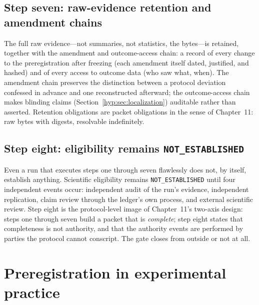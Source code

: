 \subsection{Step seven: raw-evidence retention and amendment chains}\label{hyp:sec:step7}

The full raw evidence---not summaries, not statistics, the bytes---is retained, together with the amendment and outcome-access chain: a record of every change to the preregistration after freezing (each amendment itself dated, justified, and hashed) and of every access to outcome data (who saw what, when). The amendment chain preserves the distinction between a protocol deviation confessed in advance and one reconstructed afterward; the outcome-access chain makes blinding claims (Section~\ref{hyp:sec:localization}) auditable rather than asserted. Retention obligations are packet obligations in the sense of Chapter~11: raw bytes with digests, resolvable indefinitely.

\subsection{Step eight: eligibility remains \texttt{NOT\_ESTABLISHED}}\label{hyp:sec:step8}

Even a run that executes steps one through seven flawlessly does not, by itself, establish anything. Scientific eligibility remains \texttt{NOT\_ESTABLISHED} until four independent events occur: independent audit of the run's evidence, independent replication, claim review through the ledger's own process, and external scientific review. Step eight is the protocol-level image of Chapter~11's two-axis design: steps one through seven build a packet that is \emph{complete}; step eight states that completeness is not authority, and that the authority events are performed by parties the protocol cannot conscript. The gate closes from outside or not at all.

\section{Preregistration in experimental practice}\label{hyp:sec:prereg}


